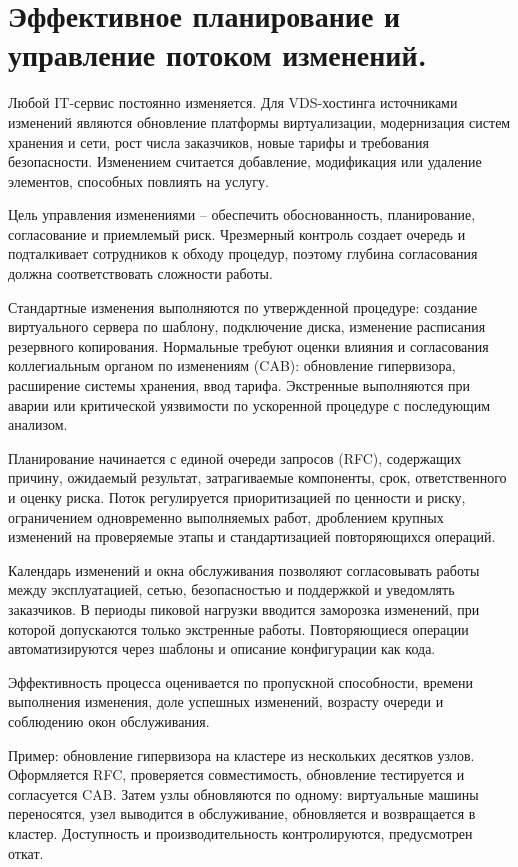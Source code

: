 \documentclass[14pt,a4paper]{extarticle}
\begin{document}
\section{Эффективное планирование и управление потоком изменений.}

Любой IT-сервис постоянно изменяется. Для VDS-хостинга источниками изменений
являются обновление платформы виртуализации, модернизация систем хранения и
сети, рост числа заказчиков, новые тарифы и требования безопасности. Изменением
считается добавление, модификация или удаление элементов, способных повлиять на
услугу.

Цель управления изменениями -- обеспечить обоснованность,
планирование, согласование и приемлемый риск. Чрезмерный контроль создает
очередь и подталкивает сотрудников к обходу процедур, поэтому глубина
согласования должна соответствовать сложности работы.

Стандартные изменения выполняются по утвержденной процедуре: создание
виртуального сервера по шаблону, подключение диска, изменение расписания
резервного копирования. Нормальные требуют оценки влияния и согласования
коллегиальным органом по изменениям (CAB): обновление гипервизора, расширение
системы хранения, ввод тарифа. Экстренные выполняются при аварии или критической
уязвимости по ускоренной процедуре с последующим анализом.

Планирование начинается с единой очереди запросов (RFC), содержащих причину,
ожидаемый результат, затрагиваемые компоненты, срок, ответственного и оценку
риска. Поток регулируется приоритизацией по ценности и риску, ограничением
одновременно выполняемых работ, дроблением крупных изменений на проверяемые
этапы и стандартизацией повторяющихся операций.

Календарь изменений и окна обслуживания позволяют согласовывать работы между
эксплуатацией, сетью, безопасностью и поддержкой и уведомлять заказчиков. В
периоды пиковой нагрузки вводится заморозка изменений, при которой допускаются
только экстренные работы. Повторяющиеся операции автоматизируются через шаблоны
и описание конфигурации как кода.

Эффективность процесса оценивается по пропускной способности, времени выполнения
изменения, доле успешных изменений, возрасту очереди и соблюдению окон
обслуживания.

Пример: обновление гипервизора на кластере из нескольких десятков узлов.
Оформляется RFC, проверяется совместимость, обновление тестируется и согласуется
CAB. Затем узлы обновляются по одному: виртуальные машины переносятся, узел
выводится в обслуживание, обновляется и возвращается в кластер. Доступность и
производительность контролируются, предусмотрен откат.
\end{document}

